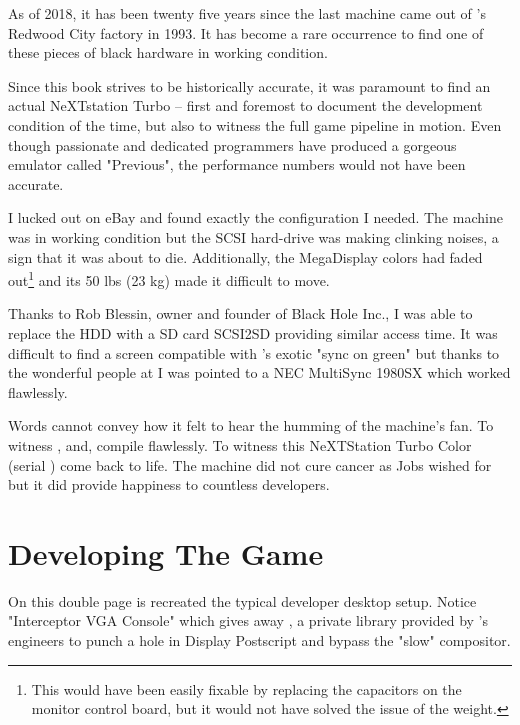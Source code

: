  As of 2018, it has been twenty five years since the last machine came out of \NeXT{}'s Redwood City factory in 1993. It has become a rare occurrence to find one of these pieces of black hardware in working condition.\\
 \par
 Since this book strives to be historically accurate, it was paramount to find an actual NeXTstation Turbo -- first and foremost to document the development condition of the time, but also to witness the full game pipeline in motion. Even though passionate and dedicated programmers have produced a gorgeous emulator called "Previous", the performance numbers would not have been accurate.\\
 \par
  I lucked out on eBay and found exactly the configuration I needed. The machine was in working condition but the SCSI hard-drive was making clinking noises, a sign that it was about to die. Additionally, the MegaDisplay colors had faded out\footnote{This would have been easily fixable by replacing the capacitors on the monitor control board, but it would not have solved the issue of the weight.} and its 50 lbs (23 kg) made it difficult to move.\\
  \par
  Thanks to Rob Blessin, owner and founder of Black Hole Inc., I was able to replace the HDD with a SD card SCSI2SD providing similar access time. It was difficult to find a screen compatible with \NeXTns{}'s exotic "sync on green" but thanks to the wonderful people at  I was pointed to a NEC MultiSync 1980SX which worked flawlessly.\\
  \par
  Words cannot convey how it felt to hear the humming of the machine's fan. To witness ,  and,  compile flawlessly. To witness this NeXTStation Turbo Color (serial ) come back to life. The machine did not cure cancer as Jobs wished for but it did provide happiness to countless developers.





\section{Developing The Game}
On this double page is recreated the typical developer desktop setup. Notice "Interceptor VGA Console" which gives away , a private library provided by \NeXTns's engineers to punch a hole in Display Postscript and bypass the "slow" compositor.\\
\par
{}

